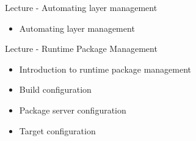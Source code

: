 \documentclass[a4paper,12pt,obeyspaces,spaces,hyphens]{article}
\begin{document}
\feagendatwocolumn
{Lecture - Automating layer management}
{
  \begin{itemize}
  \item Automating layer management
  \end{itemize}
}
{Lecture - Runtime Package Management}
{
  \begin{itemize}
  \item Introduction to runtime package management
  \item Build configuration
  \item Package server configuration
  \item Target configuration
  \end{itemize}
}
\end{document}
